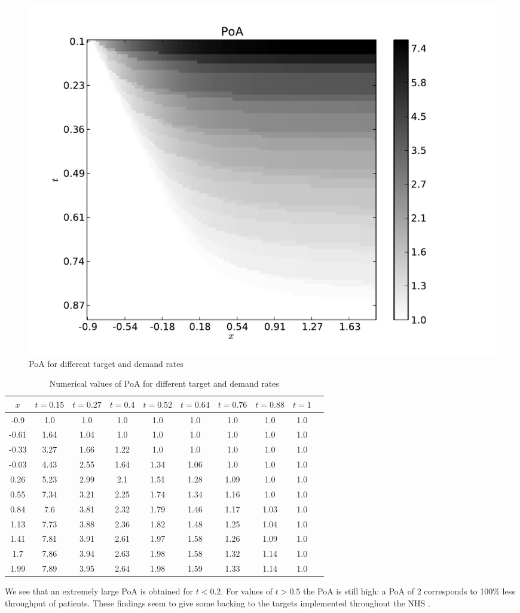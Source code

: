 \documentclass{article}
\begin{document}
\begin{figure}[!htbp]
\begin{center}
\includegraphics[width=.5\textwidth]{./Images/lnPoAmodel1targetvdemand.pdf}
\end{center}
\caption{PoA for different target and demand rates}\label{Fig:target_demand_model1}
\end{figure}

\begin{table}[!htbp]
\begin{center}
\begin{tabular}{c|ccccccccc}
\toprule
$x$&$t=0.15$&$t=0.27$&$t=0.4$&$t=0.52$&$t=0.64$&$t=0.76$&$t=0.88$&$t=1$\\
\midrule
-0.9&1.0&1.0&1.0&1.0&1.0&1.0&1.0&1.0\\
-0.61&1.64&1.04&1.0&1.0&1.0&1.0&1.0&1.0\\
-0.33&3.27&1.66&1.22&1.0&1.0&1.0&1.0&1.0\\
-0.03&4.43&2.55&1.64&1.34&1.06&1.0&1.0&1.0\\
0.26&5.23&2.99&2.1&1.51&1.28&1.09&1.0&1.0\\
0.55&7.34&3.21&2.25&1.74&1.34&1.16&1.0&1.0\\
0.84&7.6&3.81&2.32&1.79&1.46&1.17&1.03&1.0\\
1.13&7.73&3.88&2.36&1.82&1.48&1.25&1.04&1.0\\
1.41&7.81&3.91&2.61&1.97&1.58&1.26&1.09&1.0\\
1.7&7.86&3.94&2.63&1.98&1.58&1.32&1.14&1.0\\
1.99&7.89&3.95&2.64&1.98&1.59&1.33&1.14&1.0\\
\bottomrule
\end{tabular}
\end{center}
\caption{Numerical values of PoA for different target and demand rates}\label{tabletargetdemandm1}
\end{table}

We see that an extremely large PoA is obtained for $t<0.2$.
For values of $t>0.5$ the PoA is still high: a PoA of 2 corresponds to 100\% less throughput of patients.
These findings seem to give some backing to the targets implemented throughout the NHS \cite{Bevan2006}.
\end{document}
